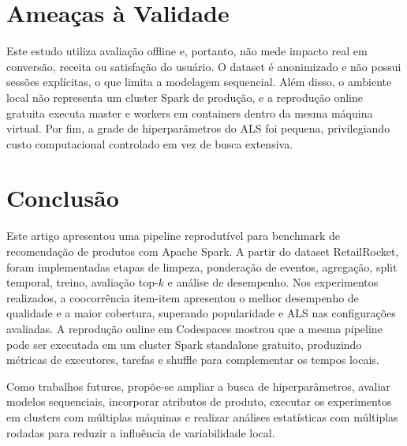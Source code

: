 \documentclass[12pt]{article}
\begin{document}
\section{Amea\c{c}as \`a Validade}

Este estudo utiliza avalia\c{c}\~ao offline e, portanto, n\~ao mede impacto real
em convers\~ao, receita ou satisfa\c{c}\~ao do usu\'ario. O dataset \'e anonimizado
e n\~ao possui sess\~oes expl\'icitas, o que limita a modelagem sequencial. Al\'em
disso, o ambiente local n\~ao representa um cluster Spark de produ\c{c}\~ao, e a
reprodu\c{c}\~ao online gratuita executa master e workers em containers dentro da
mesma m\'aquina virtual. Por fim, a grade de hiperpar\^ametros do ALS foi
pequena, privilegiando custo computacional controlado em vez de busca
extensiva.

\section{Conclus\~ao}

Este artigo apresentou uma pipeline reprodut\'ivel para benchmark de
recomenda\c{c}\~ao de produtos com Apache Spark. A partir do dataset RetailRocket,
foram implementadas etapas de limpeza, pondera\c{c}\~ao de eventos,
agrega\c{c}\~ao, split temporal, treino, avalia\c{c}\~ao top-$k$ e an\'alise de
desempenho. Nos experimentos realizados, a coocorr\^encia item-item apresentou
o melhor desempenho de qualidade e a maior cobertura, superando popularidade
e ALS nas configura\c{c}\~oes avaliadas. A reprodu\c{c}\~ao online em Codespaces
mostrou que a mesma pipeline pode ser executada em um cluster Spark
standalone gratuito, produzindo m\'etricas de executores, tarefas e shuffle
para complementar os tempos locais.

Como trabalhos futuros, prop\~oe-se ampliar a busca de hiperpar\^ametros,
avaliar modelos sequenciais, incorporar atributos de produto, executar os
experimentos em clusters com m\'ultiplas m\'aquinas e realizar an\'alises
estat\'isticas com m\'ultiplas rodadas para reduzir a influ\^encia de
variabilidade local.



\end{document}
